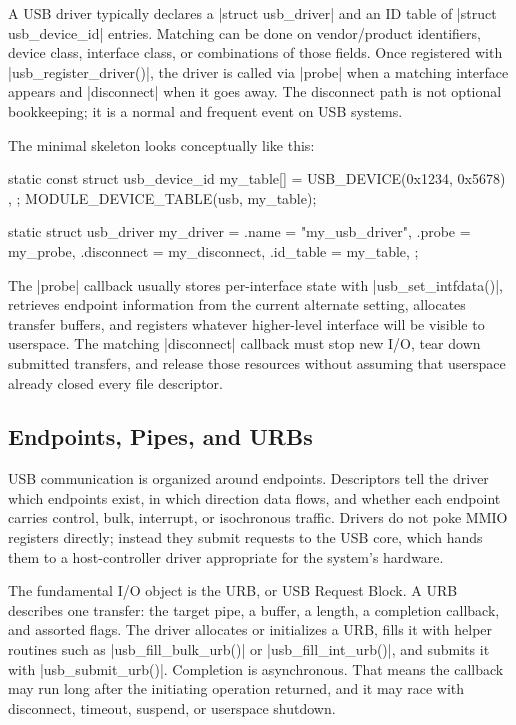 \documentclass[10pt, oneside]{book}
\begin{document}
A USB driver typically declares a \cpp|struct usb_driver| and an ID table of
\cpp|struct usb_device_id| entries.
Matching can be done on vendor/product identifiers, device class, interface
class, or combinations of those fields.
Once registered with \cpp|usb_register_driver()|, the driver is called via
\cpp|probe| when a matching interface appears and \cpp|disconnect| when it goes
away.
The disconnect path is not optional bookkeeping; it is a normal and frequent
event on USB systems.

The minimal skeleton looks conceptually like this:
\begin{code}
static const struct usb_device_id my_table[] = {
    { USB_DEVICE(0x1234, 0x5678) },
    { }
};
MODULE_DEVICE_TABLE(usb, my_table);

static struct usb_driver my_driver = {
    .name = "my_usb_driver",
    .probe = my_probe,
    .disconnect = my_disconnect,
    .id_table = my_table,
};
\end{code}

The \cpp|probe| callback usually stores per-interface state with
\cpp|usb_set_intfdata()|, retrieves endpoint information from the current
alternate setting, allocates transfer buffers, and registers whatever
higher-level interface will be visible to userspace.
The matching \cpp|disconnect| callback must stop new I/O, tear down submitted
transfers, and release those resources without assuming that userspace already
closed every file descriptor.

\subsection{Endpoints, Pipes, and URBs}
\label{sec:usb_urbs}
USB communication is organized around endpoints.
Descriptors tell the driver which endpoints exist, in which direction data
flows, and whether each endpoint carries control, bulk, interrupt, or
isochronous traffic.
Drivers do not poke MMIO registers directly; instead they submit requests to the
USB core, which hands them to a host-controller driver appropriate for the
system's hardware.

The fundamental I/O object is the URB, or USB Request Block.
A URB describes one transfer: the target pipe, a buffer, a length, a completion
callback, and assorted flags.
The driver allocates or initializes a URB, fills it with helper routines such as
\cpp|usb_fill_bulk_urb()| or \cpp|usb_fill_int_urb()|, and submits it with
\cpp|usb_submit_urb()|.
Completion is asynchronous.
That means the callback may run long after the initiating operation returned,
and it may race with disconnect, timeout, suspend, or userspace shutdown.
\end{document}
